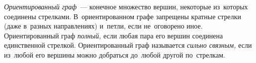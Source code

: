 




\emph{Ориентированный граф}~--- конечное множество вершин, некоторые из~которых
соединены стрелками.
В~ориентированном графе запрещены кратные стрелки (даже в~разных направлениях)
и~петли, если не~оговорено иное.
Ориентированный граф \emph{полный,} если любая пара его вершин соединена
единственной стрелкой.
Ориентированный граф называется \emph{сильно связным,} если из~любой его
вершины можно добраться до~любой другой по~стрелкам.

